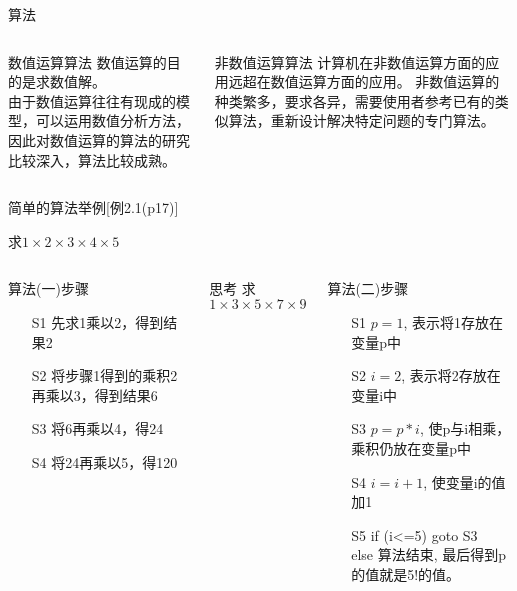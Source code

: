 \begin{frame}{算法}
\begin{columns}
	\begin{block}{数值运算算法}
	   数值运算的目的是求数值解。\\
	   由于数值运算往往有现成的模型，可以运用数值分析方法，因此对数值运算的算法的研究比较深入，算法比较成熟。	
	\end{block}
	\begin{block}{非数值运算算法}
		计算机在非数值运算方面的应用远超在数值运算方面的应用。
		非数值运算的种类繁多，要求各异，需要使用者参考已有的类似算法，重新设计解决特定问题的专门算法。
	\end{block}
\end{columns}
\end{frame}

\begin{frame}[shrink]{简单的算法举例[例2.1(p17)]}
\begin{example}
	[例2.1(p17)] 求$1\times 2\times 3\times 4\times 5$
\end{example}
\small
\begin{columns}
	\begin{block}{算法(一)步骤}
		\begin{enumerate}
			\item[S1] 先求1乘以2，得到结果2
			\item[S2] 将步骤1得到的乘积2再乘以3，得到结果6
			\item[S3] 将6再乘以4，得24
			\item[S4] 将24再乘以5，得120
		\end{enumerate}	
	\end{block}
    \begin{block}{思考}
    	求$1\times 3\times 5\times 7\times 9$
    \end{block}
	\begin{block}{算法(二)步骤}
		\begin{enumerate}
			\item[S1] $p=1$, 表示将1存放在变量p中
			\item[S2] $i=2$, 表示将2存放在变量i中
			\item[S3] $p=p*i$, 使p与i相乘，乘积仍放在变量p中
			\item[S4] $i=i+1$, 使变量i的值加1
			\item[S5] if (i<=5) goto S3\\
			          else 算法结束, 最后得到p的值就是5!的值。
		\end{enumerate}	
	\end{block}
\end{columns}
\end{frame}

